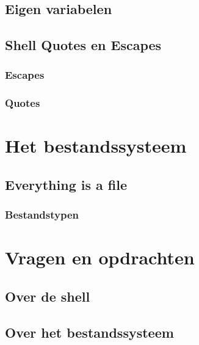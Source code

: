 \documentclass[a4paper,12pt,twoside,openright,titlepage]{article}
\begin{document}
\subsection{Eigen variabelen}

\subsection{Shell Quotes en Escapes}

\subsubsection{Escapes}

\subsubsection{Quotes}

\section{Het bestandssysteem}

\subsection{Everything is a file}

\subsubsection{Bestandstypen}

\section{Vragen en opdrachten}
\subsection{Over de shell}

\subsection{Over het bestandssysteem}


\printindex
\end{document}
